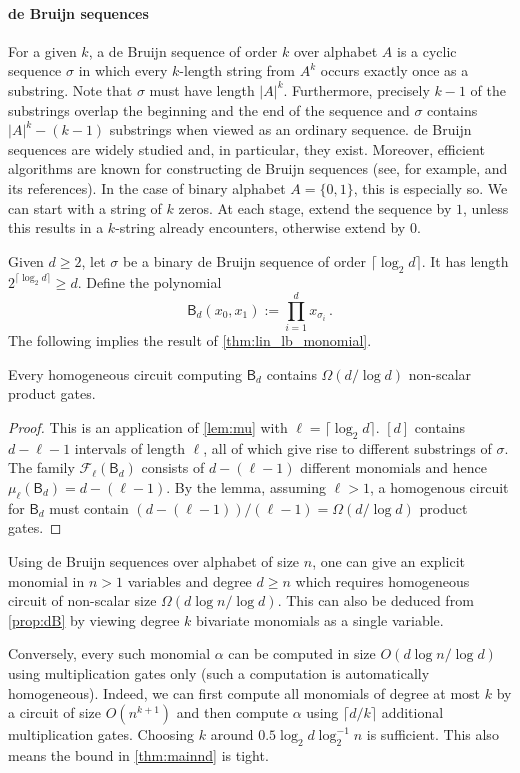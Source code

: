 \documentclass[10pt,a4paper]{article}
\renewcommand{\fam}{\textbf{$\mathcal{F}$}}
\newcommand{\dB}{\mathsf{B}}
\begin{document}
\paragraph{de Bruijn sequences}
  For a given $k$, a de Bruijn sequence of order $k$ over alphabet $A$ is a cyclic sequence $\sigma$ in which every $k$-length string from $A^k$ occurs exactly once as a substring.  
  Note that $\sigma$ must have length $|A|^k$.
  Furthermore, precisely  $k-1$ of the substrings  overlap the beginning and the end of the sequence and $\sigma$ contains $|A|^k -(k-1)$ substrings when viewed as an ordinary sequence. 
  de Bruijn sequences  are widely studied and, in particular, they exist.
  Moreover, efficient algorithms are known for constructing de Bruijn sequences (see, for example, \cite{Sww16} and its references).  
  In the case of binary alphabet $A=\{0,1\}$, this is especially so.
  We can start with a string of $k$ zeros. At each stage, extend the sequence by $1$, unless this results in a $k$-string already encounters, otherwise extend by $0$.    

  Given $d\geq 2$, let $\sigma$ be a binary de Bruijn sequence of order $\lceil \log_2 d\rceil $. 
  It has length $2^{\lceil \log_2 d\rceil} \geq d$. Define the polynomial 
  \[ 
    \dB_d(x_0,x_1):= \prod_{i=1}^d x_{\sigma_i}\,.
  \]
  The following implies the result of \autoref{thm:lin_lb_monomial}.

\begin{proposition}\label{prop:dB} 
  Every homogeneous circuit computing $\dB_d$ contains $\Omega(d/\log d)$ non-scalar product gates. 
\end{proposition}

\begin{proof}  
  This is an application of \autoref{lem:mu} with $\ell=\lceil \log_2 d\rceil$. 
  $[d]$ contains $d-{\ell-1}$ intervals of length $\ell$, all of which give rise to different substrings of $\sigma$. 
  The family $\fam_\ell(\dB_d)$ consists of $d-(\ell-1)$ different monomials and hence $\mu_\ell(\dB_d)=d-(\ell-1)$. 
  By the lemma, assuming $\ell>1$, a homogenous circuit for $\dB_d$ must contain $(d-(\ell-1))/ (\ell-1)=\Omega(d/\log d)$ product gates.  
\end{proof}

\begin{remark} \label{rem:tight}
  Using de Bruijn sequences over alphabet of size $n$, one can give an explicit monomial in $n>1$ variables and degree $d\geq n$ which requires homogeneous circuit of non-scalar size $\Omega(d\log n/ \log d)$.  
  This can also be deduced from \autoref{prop:dB} by viewing degree $k$ bivariate monomials as a single variable. 

  Conversely, every such monomial $\alpha$ can be computed in size $O(d\log n/ \log d)$ using multiplication gates only (such a computation is automatically homogeneous). 
  Indeed, we can first compute all monomials of degree at most $k$ by a circuit of size $O(n^{k+1})$ and then compute $\alpha$ using $\lceil d/k\rceil$ additional multiplication gates. 
  Choosing $k$ around $0.5\log_2d\log^{-1}_2n$ is sufficient. This also means the bound in \autoref{thm:mainnd} is tight.
\end{remark}
\end{document}
